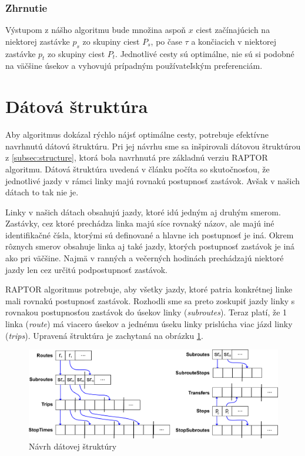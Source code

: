 \subsubsection{Zhrnutie}
Výstupom z nášho algoritmu bude množina aspoň $x$ ciest začínajúcich na niektorej zastávke $p_s$ zo skupiny ciest $P_s$, po čase $\tau$ a končiacich v niektorej zastávke $p_t$ zo skupiny ciest $P_t$. Jednotlivé cesty sú optimálne, nie sú si podobné na väčšine úsekov a vyhovujú prípadným používateľským preferenciám.

\section{Dátová štruktúra}
Aby algoritmus dokázal rýchlo nájsť optimálne cesty, potrebuje efektívne navrhnutú dátovú štruktúru. Pri jej návrhu sme sa inšpirovali dátovou štruktúrou z \ref{subsec:structure}, ktorá bola navrhnutá pre základnú verziu RAPTOR algoritmu. Dátová štruktúra uvedená v článku počíta so skutočnosťou, že jednotlivé jazdy v rámci linky majú rovnakú postupnosť zastávok. Avšak v našich dátach to tak nie je. 

Linky v našich dátach obsahujú jazdy, ktoré idú jedným aj druhým smerom. Zastávky, cez ktoré prechádza linka majú síce rovnaký názov, ale majú iné identifikačné čísla, ktorými sú definované a hlavne ich postupnosť je iná. Okrem rôznych smerov obsahuje linka aj také jazdy, ktorých postupnosť zastávok je iná ako pri väčšine. Najmä v ranných a večerných hodinách prechádzajú niektoré jazdy len cez určitú podpostupnosť zastávok. 

RAPTOR algoritmus potrebuje, aby všetky jazdy, ktoré patria konkrétnej linke mali rovnakú postupnosť zastávok. Rozhodli sme sa preto zoskupiť jazdy linky s rovnakou postupnosťou zastávok do úsekov linky (\textit{subroutes}). Teraz platí, že 1 linka (\textit{route}) má viacero úsekov a jednému úseku linky prislúcha viac jázd linky (\textit{trips}). Upravená štruktúra je zachytaná na obrázku \ref{fig:my-datastructure}.

\begin{figure}[H]
\centerline{\includegraphics[width=1.0\textwidth]{images/my-structure}}
\caption[Návrh dátovej štruktúry]{Návrh dátovej štruktúry}
\label{fig:my-datastructure}
\end{figure}

